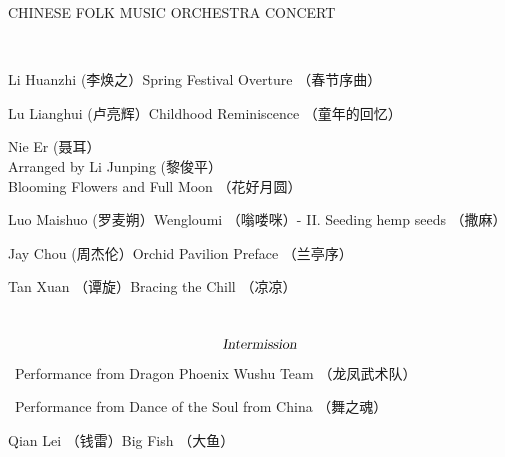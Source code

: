 \documentclass[letter,8pt,poets]{ConcProg}
\begin{document}

 \begin{spacing}{1.0} 
\begin{center}
\Huge{C}\large{HINESE } \Huge{F}\large{OLK} \Huge{M}\large{USIC} \Huge{O}\large{RCHESTRA} \Huge{C}\LARGE{ONCERT}
\end{center}
\begin{programme}{
\\  {}
}
  \begin{part}[]
    
    
   \begin{composition}{Li Huanzhi (李焕之）}{}{Spring Festival Overture （春节序曲）}{}      
    \end{composition} 
    
    
     \begin{composition}{Lu Lianghui (卢亮辉）}{}{Childhood Reminiscence （童年的回忆）}{}      
    \end{composition} 
    
     \begin{composition}{Nie Er (聂耳）\\ Arranged by Li Junping (黎俊平）}{}{Blooming Flowers and Full Moon （花好月圆）}{}      
    \end{composition} 
    
    \begin{composition}{Luo Maishuo (罗麦朔）}{}{Wengloumi （嗡喽咪）- II. Seeding hemp seeds （撒麻）}{}      
    \end{composition} 
    
    \begin{composition}{Jay Chou (周杰伦）}{}{Orchid Pavilion Preface （兰亭序）}{}      
    \end{composition} 
    
     \begin{composition}{Tan Xuan （谭旋）}{}{Bracing the Chill （凉凉）}{}      
    \end{composition}      
    \\
    $$\textsl{Intermission}$$
    \begin{composition}{\ }{}{Performance from Dragon Phoenix Wushu Team （龙凤武术队）}{}      
    \end{composition} 
     \begin{composition}{\ }{}{Performance from Dance of the Soul from China （舞之魂）}{}      
    \end{composition} 
    \begin{composition}{Qian Lei （钱雷）}{}{Big Fish （大鱼）}{}      
    \end{composition} 
    

\end{part}
\end{programme}
\end{spacing}
\end{document}
